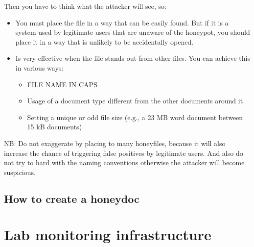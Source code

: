 \documentclass[epsfig,a4paper,11pt,titlepage,oneside,openany]{book}
\begin{document}
Then you have to think what the attacker will see, so:
\begin{itemize}
\itemsep0em
\item You must place the file in a way that can be easily found. But if it is a system used by legitimate users that are unaware of the honeypot, you should place it in a way that is unlikely to be accidentally opened.
\item Is very effective when the file stands out from other files. You can achieve this in various ways:
	\begin{itemize}
	\itemsep0em
	\item FILE NAME IN CAPS
	\item Usage of a document type different from the other documents around it
	\item Setting a unique or odd file size (e.g., a 23 MB word document between 15 kB documents)
	\end{itemize}
\end{itemize}

\noindent NB: Do not exaggerate by placing to many honeyfiles, because it will also increase the chance of triggering false positives by legitimate users. And also do not try to hard with the naming conventions otherwise the attacker will become suspicious.

\section{How to create a honeydoc}


\chapter{Lab monitoring infrastructure}
\end{document}

